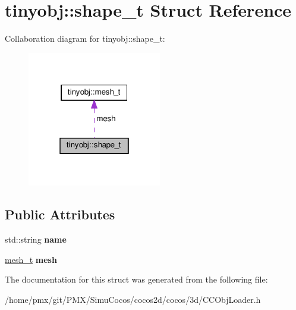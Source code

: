\hypertarget{structtinyobj_1_1shape__t}{}\section{tinyobj\+:\+:shape\+\_\+t Struct Reference}
\label{structtinyobj_1_1shape__t}


Collaboration diagram for tinyobj\+:\+:shape\+\_\+t\+:
\nopagebreak
\begin{figure}[H]
\begin{center}
\leavevmode
\includegraphics[width=166pt]{structtinyobj_1_1shape__t__coll__graph}
\end{center}
\end{figure}
\subsection*{Public Attributes}
\begin{DoxyCompactItemize}
\item 
\mbox{\label{structtinyobj_1_1shape__t_a98650e2e66d00934f68de88eafb34630}} 
std\+::string {\bfseries name}
\item 
\mbox{\label{structtinyobj_1_1shape__t_a3dacb06dfbfe9e245ff4bc7b5b3d9818}} 
\hyperlink{structtinyobj_1_1mesh__t}{mesh\+\_\+t} {\bfseries mesh}
\end{DoxyCompactItemize}


The documentation for this struct was generated from the following file\+:\begin{DoxyCompactItemize}
\item 
/home/pmx/git/\+P\+M\+X/\+Simu\+Cocos/cocos2d/cocos/3d/C\+C\+Obj\+Loader.\+h\end{DoxyCompactItemize}
